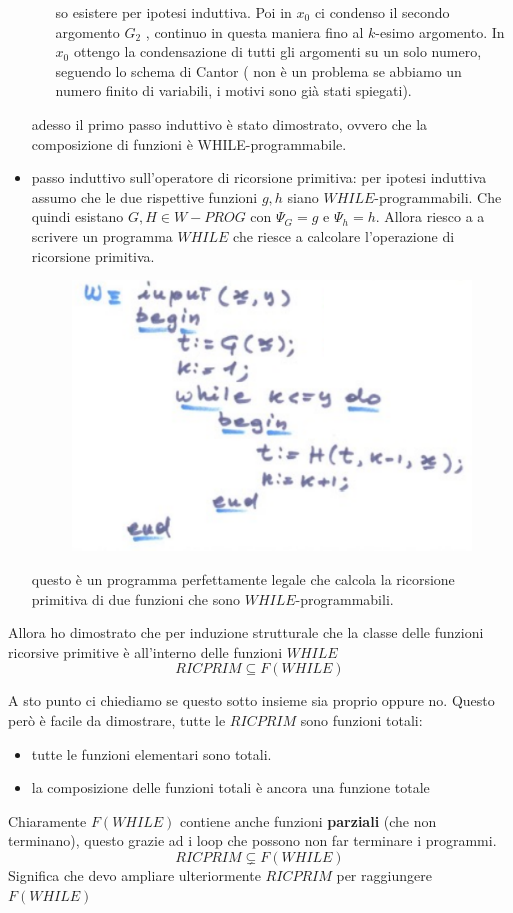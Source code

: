 \documentclass{article}
\begin{document}
\begin{itemize}
\begin{itemize}
                    so esistere per ipotesi induttiva. Poi in $x_0$ ci condenso il secondo argomento
                    $G_2$ , continuo in questa maniera fino al $k$-esimo argomento. In $x_0$ ottengo la
                    condensazione di tutti gli argomenti su un solo numero, seguendo lo schema di Cantor (
                    non è un problema se abbiamo un numero finito di variabili, i motivi sono già stati spiegati).
          \end{itemize}
          adesso il primo passo induttivo è stato dimostrato, ovvero che la composizione di funzioni
          è WHILE-programmabile.
    \item passo induttivo sull'operatore di ricorsione primitiva: per ipotesi induttiva
          assumo che le due rispettive funzioni $g,h$ siano $WHILE$-programmabili.
          Che quindi esistano $G,H\in W-PROG$ con $\Psi_G=g$ e $\Psi_h=h$.
          Allora riesco a
          a scrivere un programma $WHILE$ che riesce a calcolare l'operazione di ricorsione primitiva.
          \begin{figure}[H]
              \centering
              \includegraphics[scale=0.5]{images/while-rico.png}
          \end{figure}
          questo è un programma perfettamente legale che calcola la ricorsione primitiva di due funzioni
          che sono $WHILE$-programmabili.
\end{itemize}
Allora ho dimostrato che per induzione strutturale che la classe delle funzioni ricorsive primitive
è all'interno delle funzioni $WHILE$
$$RICPRIM\subseteq F(WHILE)$$

A sto punto ci chiediamo se questo sotto insieme sia proprio oppure no. Questo però è facile
da dimostrare, tutte le $RICPRIM$ sono funzioni totali:
\begin{itemize}
    \item tutte le funzioni elementari sono totali.
    \item la composizione delle funzioni totali è ancora una funzione totale
\end{itemize}
Chiaramente $F(WHILE)$ contiene anche funzioni \textbf{parziali} (che non terminano),
questo grazie ad i loop che possono non far terminare i programmi.
$$RICPRIM\subsetneq F(WHILE)$$
Significa che devo ampliare ulteriormente $RICPRIM$ per raggiungere $F(WHILE)$
\end{document}
